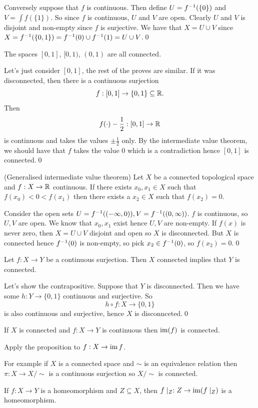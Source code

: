 \documentclass{article}
\begin{document}
Conversely suppose that $ f $ is continuous. Then define $ U = {f}^{-1}(\{0\}) $ and $ V = \int f(\{1\}) $. So since $ f $ is continuous, $ U $ and $ V $ are open. Clearly $ U $ and $ V $ is disjoint and non-empty since $ f $ is surjective. We have that $ X = U\cup V $ since $ X = {f}^{-1}(\{0,1\})= {f}^{-1}(0) \cup {f}^{-1}(1) = U \cup V $.\qed
\begin{theorem}
	The spaces $ [0,1] $, $ [0,1) $, $ (0,1) $ are all connected.
\end{theorem}
\pf Let's just consider $ [0,1] $, the rest of the proves are similar. If it was disconnected, then there is a continuous surjection
\[
	f:[0,1]\to \{0,1\}\subseteq \mathbb{R}.
\]
Then
\[
	f(\cdot)-\frac 12: [0,1]\to \mathbb{R}
\]
is continuous and takes the values $ \pm\frac 12 $ only. By the intermediate value theorem, we should have that $ f $ takes the value $ 0 $ which is a contradiction hence $ [0,1] $ is connected.\qed
\begin{theorem}
	(Generalised intermediate value theorem) Let $ X $ be a connected topological space and $ f:X\to \mathbb{R} $ continuous. If there exists $ x_0,x_1\in X $ such that $ f(x_0)< 0 < f(x_1) $ then there exists a $ x_2\in X $ such that $ f(x_2) = 0 $. 
\end{theorem}
\pf Consider the open sets $ U = {f}^{-1}((-\infty, 0)), V={f}^{-1}((0,\infty)) $. $ f $ is continuous, so $ U,V $ are open. We know that $ x_0,x_1 $ exist hence $ U,V $ are non-empty. If $ f(x) $ is never zero, then $ X=U\cup V $ disjoint and open so $ X $ is disconnected. But $ X $ is connected hence $ {f}^{-1}(0) $ is non-empty, so pick $ x_2\in {f}^{-1}(0) $, so $ f(x_2) =0  $.\qed
\begin{proposition}
  Let $ f:X\to Y $ be a continuous surjection. Then $ X	$ connected implies that $ Y $ is connected.
\end{proposition}
\pf Let's show the contrapositive. Suppose that $ Y $ is disconnected. Then we have some $ h:Y\to \{0,1\} $ continuous and surjective. So
\[
	h\circ f:X\to \{0,1\}
\]
is also continuous and surjective, hence $ X $ is disconnceted.\qed
\begin{corollary}
  If $ X $ is connected and $ f: X\to Y $ is continuous then $ \operatorname{im}(f) $ is connected.
\end{corollary}
\pf Apply the proposition to $ f:X\to\operatorname{im} f $.
\par
For example if $ X $ is a connected space and $ \sim $ is an equivalence relation then $ \pi :X\to X/\sim $ is a continuous surjection so $ X/\sim $ is connected.
\begin{lemma}
  If $ f:X\to Y $ is a homeomorphism and $ Z\subseteq X $, then $ f\mid_Z:Z\to \operatorname{im}(f\mid_Z) $ is a homeomorphism.
\end{lemma}
\end{document}
